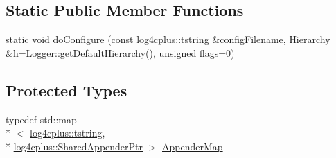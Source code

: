 \subsection*{Static Public Member Functions}
\begin{DoxyCompactItemize}
\item 
static void \hyperlink{classlog4cplus_1_1PropertyConfigurator_ac8a789fdb849ec689ead3cad69bd86e5}{do\-Configure} (const \hyperlink{namespacelog4cplus_a3c9287f6ebcddc50355e29d71152117b}{log4cplus\-::tstring} \&config\-Filename, \hyperlink{classlog4cplus_1_1Hierarchy}{Hierarchy} \&\hyperlink{classlog4cplus_1_1PropertyConfigurator_ae80f772be9d4eb67922d34f4e2dd71d1}{h}=\hyperlink{classlog4cplus_1_1Logger_a8d258d78a9a86f1f3a3241f43d015287}{Logger\-::get\-Default\-Hierarchy}(), unsigned \hyperlink{classlog4cplus_1_1PropertyConfigurator_af813851c5e5b234239b7ea974fb8e4b2}{flags}=0)
\end{DoxyCompactItemize}
\subsection*{Protected Types}
\begin{DoxyCompactItemize}
\item 
typedef std\-::map\\*
$<$ \hyperlink{namespacelog4cplus_a3c9287f6ebcddc50355e29d71152117b}{log4cplus\-::tstring}, \\*
\hyperlink{namespacelog4cplus_a12d841b842c72396be9219ce67a0c215}{log4cplus\-::\-Shared\-Appender\-Ptr} $>$ \hyperlink{classlog4cplus_1_1PropertyConfigurator_a8348301eeeee11e2c7c121f3ccb5c283}{Appender\-Map}
\end{DoxyCompactItemize}
